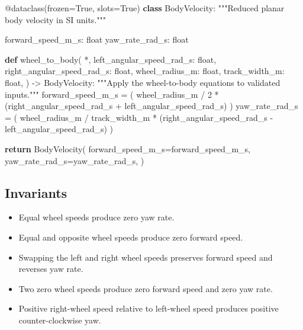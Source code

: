 \documentclass[
  australian,
  12pt,
  letterpaper,
  DIV=11,
  numbers=noendperiod,
  twoside]{scrreprt}
\newenvironment{Shaded}{\begin{snugshade}}{\end{snugshade}}
\newcommand{\AttributeTok}[1]{\textcolor[rgb]{0.40,0.45,0.13}{#1}}
\newcommand{\BuiltInTok}[1]{\textcolor[rgb]{0.00,0.23,0.31}{#1}}
\newcommand{\CommentTok}[1]{\textcolor[rgb]{0.37,0.37,0.37}{#1}}
\newcommand{\ControlFlowTok}[1]{\textcolor[rgb]{0.00,0.23,0.31}{\textbf{#1}}}
\newcommand{\DecValTok}[1]{\textcolor[rgb]{0.68,0.00,0.00}{#1}}
\newcommand{\KeywordTok}[1]{\textcolor[rgb]{0.00,0.23,0.31}{\textbf{#1}}}
\newcommand{\NormalTok}[1]{\textcolor[rgb]{0.00,0.23,0.31}{#1}}
\newcommand{\OperatorTok}[1]{\textcolor[rgb]{0.37,0.37,0.37}{#1}}
\newcommand{\VariableTok}[1]{\textcolor[rgb]{0.07,0.07,0.07}{#1}}
\providecommand{\tightlist}{%
  \setlength{\itemsep}{0pt}\setlength{\parskip}{0pt}}
\begin{document}
\begin{Shaded}
\begin{Highlighting}[]
\AttributeTok{@dataclass}\NormalTok{(frozen}\OperatorTok{=}\VariableTok{True}\NormalTok{, slots}\OperatorTok{=}\VariableTok{True}\NormalTok{)}
\KeywordTok{class}\NormalTok{ BodyVelocity:}
    \CommentTok{"""Reduced planar body velocity in SI units."""}

\NormalTok{    forward\_speed\_m\_s: }\BuiltInTok{float}
\NormalTok{    yaw\_rate\_rad\_s: }\BuiltInTok{float}


\KeywordTok{def}\NormalTok{ wheel\_to\_body(}
    \OperatorTok{*}\NormalTok{,}
\NormalTok{    left\_angular\_speed\_rad\_s: }\BuiltInTok{float}\NormalTok{,}
\NormalTok{    right\_angular\_speed\_rad\_s: }\BuiltInTok{float}\NormalTok{,}
\NormalTok{    wheel\_radius\_m: }\BuiltInTok{float}\NormalTok{,}
\NormalTok{    track\_width\_m: }\BuiltInTok{float}\NormalTok{,}
\NormalTok{) }\OperatorTok{{-}\textgreater{}}\NormalTok{ BodyVelocity:}
    \CommentTok{"""Apply the wheel{-}to{-}body equations to validated inputs."""}
\NormalTok{    forward\_speed\_m\_s }\OperatorTok{=}\NormalTok{ (}
\NormalTok{        wheel\_radius\_m }\OperatorTok{/} \DecValTok{2}
        \OperatorTok{*}\NormalTok{ (right\_angular\_speed\_rad\_s }\OperatorTok{+}\NormalTok{ left\_angular\_speed\_rad\_s)}
\NormalTok{    )}
\NormalTok{    yaw\_rate\_rad\_s }\OperatorTok{=}\NormalTok{ (}
\NormalTok{        wheel\_radius\_m }\OperatorTok{/}\NormalTok{ track\_width\_m}
        \OperatorTok{*}\NormalTok{ (right\_angular\_speed\_rad\_s }\OperatorTok{{-}}\NormalTok{ left\_angular\_speed\_rad\_s)}
\NormalTok{    )}

    \ControlFlowTok{return}\NormalTok{ BodyVelocity(}
\NormalTok{        forward\_speed\_m\_s}\OperatorTok{=}\NormalTok{forward\_speed\_m\_s,}
\NormalTok{        yaw\_rate\_rad\_s}\OperatorTok{=}\NormalTok{yaw\_rate\_rad\_s,}
\NormalTok{    )}
\end{Highlighting}
\end{Shaded}

\subsection{Invariants}\label{invariants}

\begin{itemize}
\tightlist
\item
  Equal wheel speeds produce zero yaw rate.
\item
  Equal and opposite wheel speeds produce zero forward speed.
\item
  Swapping the left and right wheel speeds preserves forward speed and
  reverses yaw rate.
\item
  Two zero wheel speeds produce zero forward speed and zero yaw rate.
\item
  Positive right-wheel speed relative to left-wheel speed produces
  positive counter-clockwise yaw.
\end{itemize}
\end{document}

